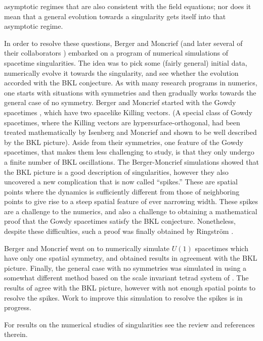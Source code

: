 \documentclass[12pt]{iopart}
\begin{document}
asymptotic regimes that are also consistent with the field equations; nor does it mean that a general evolution towards a singularity gets itself into that asymptotic regime. 

In order to resolve these questions, Berger and Moncrief \cite{BM1} (and later several of their collaborators \cite{BM2}) embarked on a program of numerical simulations of spacetime singularities.  The idea was to pick some (fairly general) initial data, numerically evolve it towards the singularity, and see whether the evolution accorded with the BKL conjecture.  As with many research programs in numerics, one starts with situations with symmetries and then gradually works towards the general case of no symmetry.  Berger and Moncrief started with the Gowdy spacetimes \cite{Gowdy}, which have two spacelike Killing vectors.  (A special class of Gowdy spacetimes, where the Killing vectors are hypersurface-orthogonal, had been treated mathematically by Isenberg and Moncrief \cite{IM} and shown to be well described by the BKL picture). Aside from their symmetries, one feature of the Gowdy spacetimes, that makes them less challenging to study, is that they only undergo a finite number of BKL oscillations.  The Berger-Moncrief simulations showed that the BKL picture is a good description of singularities, however they also uncovered a new complication that is now called ``spikes.''  These are spatial points where the dynamics is sufficiently different from those of neighboring points to give rise to a steep spatial feature of ever narrowing width.  These spikes are a challenge to the numerics, and also a challenge to obtaining a mathematical proof that the Gowdy spacetimes satisfy the BKL conjecture.  Nonetheless, despite these difficulties, such a proof was finally obtained by Ringstr\"om \cite{Ringstrom}.

Berger and Moncrief went on to numerically simulate $U(1)$ spacetimes \cite{U1} which have only one spatial symmetry, and obtained results in agreement with the BKL picture.  Finally, the general case with no symmetries was simulated in \cite{G1} using a somewhat different method based on the scale invariant tetrad system of \cite{Uggla}.  The results of \cite{G1} agree with the BKL picture, however with not enough spatial points to resolve the spikes.  Work to improve this simulation to resolve the spikes is in progress.    

For results on the numerical studies of singularities see the review \cite{Ber} and references therein.
\end{document}
